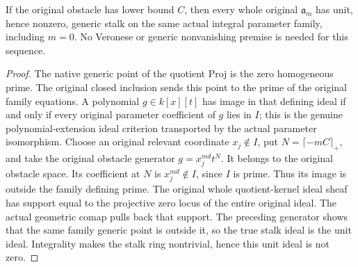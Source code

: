 \begin{proposition}
\label{prop:c0n-original-obstacle-generic-stalk}
\leanok
{}
If the original obstacle has lower bound $C$, then every whole original
$\mathfrak a_m$ has unit, hence nonzero, generic stalk on the same actual
integral parameter family, including $m=0$. No Veronese or generic
nonvanishing premise is needed for this sequence.
\end{proposition}
\begin{proof}
The native generic point of the quotient Proj is the zero homogeneous prime.
The original closed inclusion sends this point to the prime of the original
family equations. A polynomial $g\in k[x][t]$ has image in that defining ideal
if and only if every original parameter coefficient of $g$ lies in $I$; this
is the genuine polynomial-extension ideal criterion transported by the actual
parameter isomorphism. Choose an original relevant coordinate $x_j\notin I$,
put $N=\lceil-mC\rceil_+$, and take the original obstacle generator
$g=x_j^{md}t^N$. It belongs to the original obstacle space. Its coefficient at
$N$ is $x_j^{md}\notin I$, since $I$ is prime. Thus its image is outside the
family defining prime. The original whole quotient-kernel ideal sheaf has
support equal to the projective zero locus of the entire original ideal.
The actual geometric comap pulls back that support. The preceding generator
shows that the same family generic point is outside it, so the true stalk
ideal is the unit ideal. Integrality makes the stalk ring nontrivial, hence
this unit ideal is not zero.
\end{proof}

